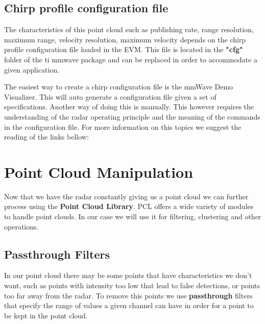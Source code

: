 \documentclass[12pt]{article}
\begin{document}
\subsection{Chirp profile configuration file}
The characteristics of this point cloud such as publishing rate, range resolution, maximum range, velocity resolution, maximum velocity depends on the chirp profile configuration file loaded in the EVM. This file is located in the \textbf{"cfg"} folder of the ti mmwave package and can be replaced in order to accommodate a given application.

The easiest way to create a chirp configuration file is the mmWave Demo Visualizer. This will auto generate a configuration file given a set of specifications.
Another way of doing this is manually. This however requires the understanding of the radar operating principle and the meaning of the commands in the configuration file.
For more information on this topics we suggest the reading of the links bellow:

\section{Point Cloud Manipulation}
Now that we have the radar constantly giving us a point cloud we can further process using the \textbf{Point Cloud Library}. PCL offers a wide variety of modules to handle point clouds. In our case we will use it for filtering, clustering and other operations.
\subsection{Passthrough Filters}
In our point cloud there may be some points that have characteristics we don't want, such as points with intensity too low that lead to false detections, or points too far away from the radar. To remove this points we use \textbf{passthrough} filters that specify the range of values a given channel can have in order for a point to be kept in the point cloud. 
\end{document}
